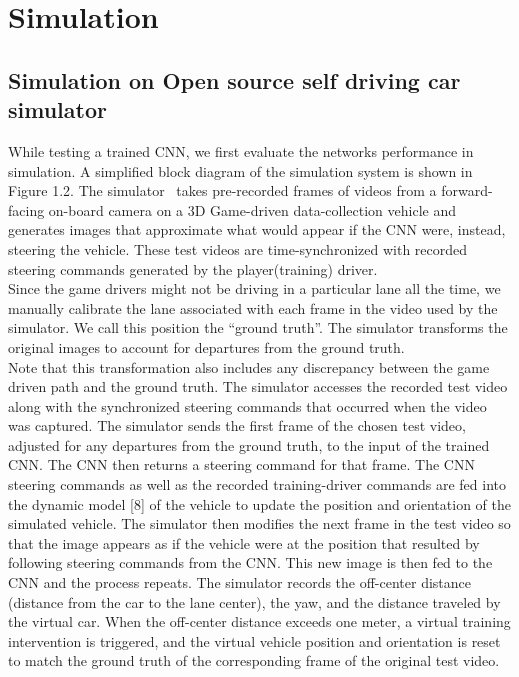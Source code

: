 \chapter{Simulation}

\section{Simulation on Open source self driving car simulator}

 While testing a trained CNN, we first evaluate the networks performance in simulation. A simplified block diagram of the simulation system is shown in Figure 1.2. The simulator~\cite{buyval2018realtime} takes pre-recorded frames of videos from a forward-facing on-board camera on a 3D Game-driven data-collection vehicle and generates images that approximate what would appear if the CNN were, instead, steering the vehicle. These test videos are time-synchronized with recorded steering commands generated by the player(training) driver.\\

Since the game drivers might not be driving in a particular lane all the time, we manually calibrate the lane associated with each frame in the video used by the simulator. We call this position the “ground truth”. The simulator transforms the original images to account for departures from the ground truth.\\

Note that this transformation also includes any discrepancy between the game driven path and the ground truth. The simulator accesses the recorded test video along with the synchronized steering commands that occurred when the video was captured. The simulator sends the first frame of the chosen test video, adjusted for any departures from the ground truth, to the input of the trained CNN. The CNN then returns a steering command for that frame. The CNN steering commands as well as the recorded training-driver commands are fed into the dynamic model [8] of the vehicle to update the position and orientation of the simulated vehicle. The simulator then modifies the next frame in the test video so that the image appears as if the vehicle were at the position that resulted by following steering commands from the CNN. This new image is then fed to the CNN and the process repeats. The simulator records the off-center distance (distance from the car to the lane center), the yaw, and the distance traveled by the virtual car. When the off-center distance exceeds one meter, a virtual training intervention is triggered, and the virtual vehicle position and orientation is reset to match the ground truth of the corresponding frame of the original test video. 

